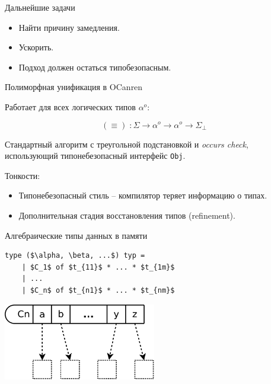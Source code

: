 \documentclass[10pt, mathserif]{beamer}
\newcommand{\oo}[1]{{#1}^o}
\theoremstyle{definition}
\begin{document}

\begin{frame}[fragile]{Дальнейшие задачи}
  \begin{itemize}
  \item Найти причину замедления.
  \item Ускорить.
  \item Подход должен остаться типобезопасным.
  \end{itemize}

\end{frame}

\begin{frame}[fragile]{Полиморфная унификация в OCanren}

Работает для всех логических типов  $\oo{\alpha}$:

$$
(\equiv)\;\colon \Sigma\to\oo{\alpha}\to\oo{\alpha}\to\Sigma_{\perp}
$$
\pause

Стандартный алгоритм с треугольной подстановкой и \textit{occurs check}, использующий типонебезопасный интерфейс  \lstinline{Obj}.
\pause

\vspace{3em}
Тонкости:
\begin{itemize}
\item Типонебезопасный стиль -- компилятор теряет информацию о типах.
\item Дополнительная стадия восстановления типов (refinement).
\end{itemize}
\end{frame}


\begin{frame}[fragile]{Алгебраические типы данных в памяти}
  \centering
  \begin{lstlisting}[mathescape=true]
    type ($\alpha, \beta, ...$) typ =   
    | $C_1$ of $t_{11}$ * ... * $t_{1m}$  
    | ...
    | $C_n$ of $t_{n1}$ * ... * $t_{nm}$  
  \end{lstlisting}
  \pause
  \vspace{3em}
  \includegraphics[width=0.5\textwidth]{algebraic.png}

\end{frame}
\end{document}
